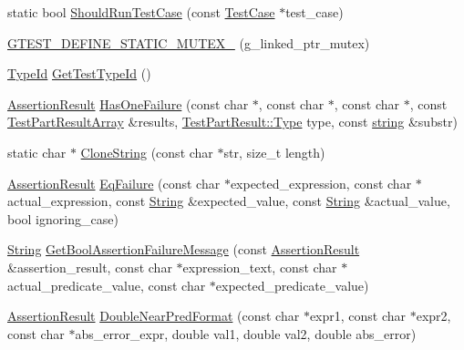 \begin{DoxyCompactItemize}
\item 
static bool \hyperlink{namespacetesting_1_1internal_a122ad0eb3b65d677feb96b46ee9c6848}{\-Should\-Run\-Test\-Case} (const \hyperlink{classtesting_1_1TestCase}{\-Test\-Case} $\ast$test\-\_\-case)
\item 
\hyperlink{namespacetesting_1_1internal_a05969f8c5401ec62be3a1f077c592c59}{\-G\-T\-E\-S\-T\-\_\-\-D\-E\-F\-I\-N\-E\-\_\-\-S\-T\-A\-T\-I\-C\-\_\-\-M\-U\-T\-E\-X\-\_\-} (g\-\_\-linked\-\_\-ptr\-\_\-mutex)
\item 
\hyperlink{namespacetesting_1_1internal_ac8e91f0c6a06c0361dc3152ddfeb2342}{\-Type\-Id} \hyperlink{namespacetesting_1_1internal_a3e7f71e983859c908bae4ec8d593ff58}{\-Get\-Test\-Type\-Id} ()
\item 
\hyperlink{classtesting_1_1AssertionResult}{\-Assertion\-Result} \hyperlink{namespacetesting_1_1internal_a7a411c778e3dd9249e6c518dabc21ca4}{\-Has\-One\-Failure} (const char $\ast$, const char $\ast$, const char $\ast$, const \hyperlink{classtesting_1_1TestPartResultArray}{\-Test\-Part\-Result\-Array} \&results, \hyperlink{classtesting_1_1TestPartResult_a1d1cfd8ffb84e947f82999c682b666a7}{\-Test\-Part\-Result\-::\-Type} type, const \hyperlink{namespacetesting_1_1internal_a9882e571372fc19a02d2b2949e1f1557}{string} \&substr)
\item 
static char $\ast$ \hyperlink{namespacetesting_1_1internal_a574775e3e17e34fd6bd1cc8b4516a499}{\-Clone\-String} (const char $\ast$str, size\-\_\-t length)
\item 
\hyperlink{classtesting_1_1AssertionResult}{\-Assertion\-Result} \hyperlink{namespacetesting_1_1internal_a1b32471fa3a4994b5e41120a349162ca}{\-Eq\-Failure} (const char $\ast$expected\-\_\-expression, const char $\ast$actual\-\_\-expression, const \hyperlink{classtesting_1_1internal_1_1String}{\-String} \&expected\-\_\-value, const \hyperlink{classtesting_1_1internal_1_1String}{\-String} \&actual\-\_\-value, bool ignoring\-\_\-case)
\item 
\hyperlink{classtesting_1_1internal_1_1String}{\-String} \hyperlink{namespacetesting_1_1internal_ab5e2ffddf04d86a4faa0253b8e1fe67e}{\-Get\-Bool\-Assertion\-Failure\-Message} (const \hyperlink{classtesting_1_1AssertionResult}{\-Assertion\-Result} \&assertion\-\_\-result, const char $\ast$expression\-\_\-text, const char $\ast$actual\-\_\-predicate\-\_\-value, const char $\ast$expected\-\_\-predicate\-\_\-value)
\item 
\hyperlink{classtesting_1_1AssertionResult}{\-Assertion\-Result} \hyperlink{namespacetesting_1_1internal_a44c08eb9054d3bf89ac3e7ac0549929f}{\-Double\-Near\-Pred\-Format} (const char $\ast$expr1, const char $\ast$expr2, const char $\ast$abs\-\_\-error\-\_\-expr, double val1, double val2, double abs\-\_\-error)

\end{DoxyCompactItemize}
